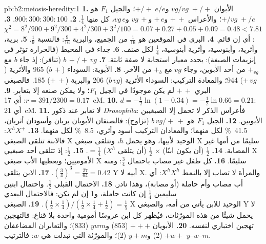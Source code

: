 \begin{solution}{pb:b2:meiosis-heredity:1}
\textbf{1.} الأبوان $vg/vg\;+/+$ و$+/+\;e/e$؛ والجيل $F_1$ هو $+/vg\;+/e$؛
والأعراس $+\,+$ و$+\,e$ و$vg\,+$ و$vg\,e$، كل منها $\tfrac14$.
\textbf{2.} $900 : 300 : 300 : 100$.
\textbf{3.} $\chi^2 = 8^2/900 + 9^2/300 + 4^2/300 + 3^2/100 = 0.07 +
0.27 + 0.05 + 0.09 = 0.48 < 7.81$: أي إن  قائم.
\textbf{4.}  البري في الموقعين هو $\tfrac{1}{16}$ من
الجميع، والبرية $\tfrac{9}{16}$: فالنسبة $\tfrac19$.
\textbf{5.} برية، وأثرية، وأبنوسية، وأثرية أبنوسية، $\tfrac14$ لكل صنف.
\textbf{6.}  جداء  في المحيط (فالحرارة
تؤثر في إنزيمات الصبغة):  يحدد معيار استجابة لا صفة
ثابتة.
\textbf{7.} $b\,+/+\,vg$ (تنافر): إذ جاء $b$ مع $+_{vg}$ من أحد
الأبوين، وجاء $vg$ مع $+_b$ من الآخر.
\textbf{8.} الأبوية: السوداء ($b\,+$) 965 والأثرية ($+\,vg$) 944؛
والمعادة التركيب: السوداء الأثرية ($b\,vg$) 206 والبرية ($+\,+$) 185.
فالصبغي البري $+\,+$ لم يكن موجودًا في الجيل $F_1$؛ ولا يمكن
صنعه إلا بتعابر.
\textbf{9.} $r = 391/2300 = 0.17$: أي \qty{17}{cM}.
\textbf{10.} $d = -\tfrac12\ln(1 - 0.34) = -\tfrac12\ln 0.66 = 0.21$:
أي \qty{21}{cM}.
\textbf{11.} لا تعابر عند ذكور \emph{Drosophila}:
فأعراس الذكر لا تحمل إلا الصبغيين الأبويين.
\textbf{12.} الجيل $F_1$ هو $b\,vg/+\,+$ (تزاوج): فالصنفان الأبويان
بريان وأسودان أثريان، \qty{41.5}{\%} لكل منهما؛ والمعادان التركيب
أسود وأثري، \qty{8.5}{\%} لكل منهما.
\textbf{13.} $X^hX^+$: فالابنة تتلقى الصبغي X الوحيد لأبيها، وهو
يحمل $h$، وتتلقى صبغي X سليمًا من أمها غير المصابة.
\textbf{14.} $\tfrac12$ (أن يكون ابنًا) $\times$ $\tfrac12$ (أن يتلقى $X^h$) $=
\tfrac14$.
\textbf{15.} $\tfrac12$: إذ تتلقى أحد صبغيي X الأموميين؛ ويعطيها
الأب صبغي X سليمًا.
\textbf{16.} كل طفل غير مصاب باحتمال $\tfrac34$:
ومنه $(\tfrac34)^3 = \tfrac{27}{64} = 0.42$.
\textbf{17.} الابن يتلقى Y أبيه لا X. والمرأة لا تصاب إلا بالنمط
$X^hX^h$: أي أب مصاب وأم حاملة (أو مصابة)، وهذا نادر.
\textbf{18.} الاحتمال القبلي $\tfrac12$. واحتمال ابنين سليمين
$\tfrac14$ إن كانت حاملة، و1 إن لم تكن: فالاحتمال البعدي $(\tfrac12\times
\tfrac14)/(\tfrac12\times\tfrac14 + \tfrac12) = \tfrac15$.
\textbf{19.} الصبغي X الوحيد للابن يأتي من أمه، والصبغي Y لا يحمل
شيئًا من هذه المورّثات، فيُظهر كل ابن عروسًا أمومية واحدة بلا قناع:
فالتهجين تهجين اختباري لنفسه.
\textbf{20.} الأبويان $+++$ (853) و$ywm$ (833)؛ والتعابران المضاعفان
$+w+$ (2) و$y+m$ (2)؛ والمورّثة التي تبدلت هي $w$: فالترتيب $y$--$w$--$m$.

\end{solution}
